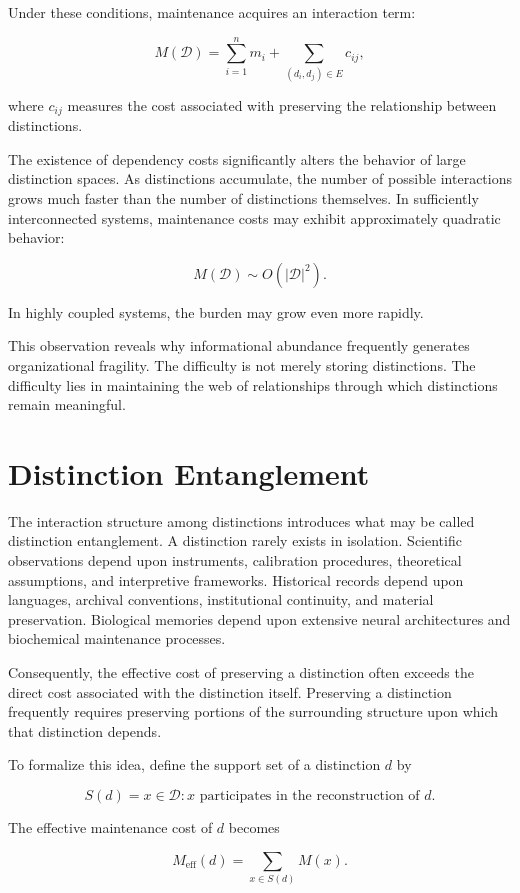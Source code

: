 \documentclass[12pt,oneside]{book}
\theoremstyle{plain} \newtheorem{theorem}{Theorem}[chapter] \newtheorem{lemma}[theorem]{Lemma} \newtheorem{proposition}[theorem]{Proposition} \newtheorem{corollary}[theorem]{Corollary}
\theoremstyle{definition} \newtheorem{definition}[theorem]{Definition} \newtheorem{axiom}[theorem]{Axiom} \newtheorem{construction}[theorem]{Construction}
\theoremstyle{remark} \newtheorem{remark}[theorem]{Remark} \newtheorem{example}[theorem]{Example}
\newcommand{\D}{\mathcal{D}} \newcommand{\R}{\mathcal{R}} \newcommand{\F}{\mathcal{F}} \newcommand{\U}{\mathcal{U}} \newcommand{\M}{\mathcal{M}} \newcommand{\G}{\Gamma}
\begin{document}
Under these conditions, maintenance acquires an interaction term:

\[
M(\D)
=
\sum_{i=1}^{n}m_i
+
\sum_{(d_i,d_j)\in E}
c_{ij},
\]

where $c_{ij}$ measures the cost associated with preserving the relationship between distinctions.

The existence of dependency costs significantly alters the behavior of large distinction spaces. As distinctions accumulate, the number of possible interactions grows much faster than the number of distinctions themselves. In sufficiently interconnected systems, maintenance costs may exhibit approximately quadratic behavior:

\[
M(\D)
\sim
O(|\D|^2).
\]

In highly coupled systems, the burden may grow even more rapidly.

This observation reveals why informational abundance frequently generates organizational fragility. The difficulty is not merely storing distinctions. The difficulty lies in maintaining the web of relationships through which distinctions remain meaningful.

\section{Distinction Entanglement}

The interaction structure among distinctions introduces what may be called distinction entanglement. A distinction rarely exists in isolation. Scientific observations depend upon instruments, calibration procedures, theoretical assumptions, and interpretive frameworks. Historical records depend upon languages, archival conventions, institutional continuity, and material preservation. Biological memories depend upon extensive neural architectures and biochemical maintenance processes.

Consequently, the effective cost of preserving a distinction often exceeds the direct cost associated with the distinction itself. Preserving a distinction frequently requires preserving portions of the surrounding structure upon which that distinction depends.

To formalize this idea, define the support set of a distinction $d$ by

\[
S(d)
=
{x\in \D : x \text{ participates in the reconstruction of } d}.
\]

The effective maintenance cost of $d$ becomes

\[
M_{\text{eff}}(d)
=
\sum_{x\in S(d)}
M(x).
\]
\end{document}
